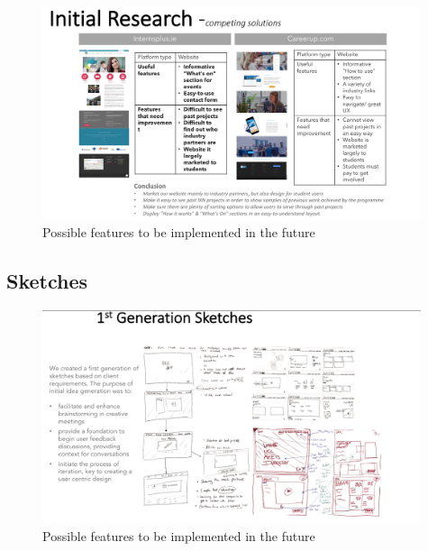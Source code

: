 \documentclass[fontsize=10pt]{extarticle}
\numberwithin{figure}{section} %
\begin{document}
\begin{landscape}
  \begin{figure}[H]
      \centering
      \includegraphics[trim = 0 0 0 0, clip, width=0.99\textwidth]{app5.png}
      \caption{Possible features to be implemented in the future}
 \end{figure}
 \end{landscape}

\newpage

\hypertarget{sketches}{%
\subsection{Sketches}\label{sketches}}

\begin{landscape}
 \begin{figure}[H]
      \centering
      \includegraphics[trim = 0 0 0 0, clip, width=0.99\textwidth]{app4.png}
      \caption{Possible features to be implemented in the future}
 \end{figure}
  \end{landscape}

\newpage
\end{document}
